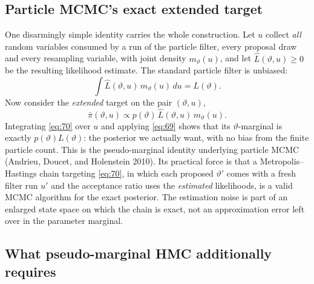 \documentclass[11pt]{article}
\begin{document}
\subsection{Particle MCMC's exact extended target}\label{sec:pm-target}

One disarmingly simple identity carries the whole construction. Let $u$ collect \emph{all} random variables
consumed by a run of the particle filter, every proposal draw and every
resampling variable, with joint density $m_\vartheta(u)$, and let
$\widehat L(\vartheta,u)\geq 0$ be the resulting likelihood estimate. The
standard particle filter is unbiased:
\begin{equation}\label{eq:69}
 \int \widehat L(\vartheta,u)\,m_\vartheta(u)\,du = L(\vartheta).
\end{equation}
Now consider the \emph{extended} target on the pair $(\vartheta,u)$,
\begin{equation}\label{eq:70}
 \bar\pi(\vartheta,u) \propto p(\vartheta)\,\widehat L(\vartheta,u)\,m_\vartheta(u).
\end{equation}
Integrating \eqref{eq:70} over $u$ and applying \eqref{eq:69} shows that its
$\vartheta$-marginal is exactly $p(\vartheta)L(\vartheta)$: the posterior we
actually want, with no bias from the finite particle count. This is the
pseudo-marginal identity underlying particle MCMC (Andrieu, Doucet, and
Holenstein 2010). Its practical force is that a Metropolis--Hastings chain
targeting \eqref{eq:70}, in which each proposed $\vartheta'$ comes with a fresh
filter run $u'$ and the acceptance ratio uses the \emph{estimated} likelihoods,
is a valid MCMC algorithm for the exact posterior. The estimation noise is
part of an enlarged state space on which the chain is exact, not an
approximation error left over in the parameter marginal.

\subsection{What pseudo-marginal HMC additionally requires}\label{sec:pmhmc}
\end{document}
